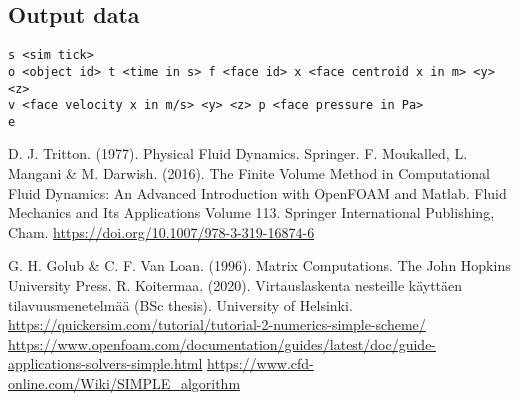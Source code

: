 \documentclass[12pt]{article}
\begin{document}
\subsection{Output data}

\begin{verbatim}
s <sim tick>
o <object id> t <time in s> f <face id> x <face centroid x in m> <y> <z> 
v <face velocity x in m/s> <y> <z> p <face pressure in Pa>
e
\end{verbatim}

\begin{thebibliography}{9}
 D. J. Tritton. (1977). Physical Fluid Dynamics. Springer.  
 F. Moukalled, L. Mangani \& M. Darwish. (2016). The Finite Volume Method in Computational Fluid Dynamics: An Advanced Introduction with OpenFOAM and Matlab. Fluid Mechanics and Its Applications Volume 113. Springer International Publishing, Cham. \url{https://doi.org/10.1007/978-3-319-16874-6}

 G. H. Golub \& C. F. Van Loan. (1996). Matrix Computations. The John Hopkins University Press.
 R. Koitermaa. (2020). Virtauslaskenta nesteille käyttäen tilavuusmenetelmää (BSc thesis). University of Helsinki.
 \url{https://quickersim.com/tutorial/tutorial-2-numerics-simple-scheme/}
 \url{https://www.openfoam.com/documentation/guides/latest/doc/guide-applications-solvers-simple.html}
 \url{https://www.cfd-online.com/Wiki/SIMPLE_algorithm}

\end{thebibliography}
\end{document}
